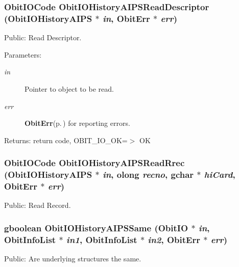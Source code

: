 \subsubsection{\setlength{\rightskip}{0pt plus 5cm}Obit\-IOCode Obit\-IOHistory\-AIPSRead\-Descriptor ({\bf Obit\-IOHistory\-AIPS} $\ast$ {\em in}, {\bf Obit\-Err} $\ast$ {\em err})}\label{ObitIOHistoryAIPS_8h_a17}


Public: Read Descriptor. 

\begin{Desc}
\item[Parameters:]
\begin{description}
\item[{\em in}]Pointer to object to be read. \item[{\em err}]{\bf Obit\-Err}{\rm (p.\,\pageref{structObitErr})} for reporting errors. \end{description}
\end{Desc}
\begin{Desc}
\item[Returns:]return code, OBIT\_\-IO\_\-OK=$>$ OK \end{Desc}
\subsubsection{\setlength{\rightskip}{0pt plus 5cm}Obit\-IOCode Obit\-IOHistory\-AIPSRead\-Rrec ({\bf Obit\-IOHistory\-AIPS} $\ast$ {\em in}, {\bf olong} {\em recno}, gchar $\ast$ {\em hi\-Card}, {\bf Obit\-Err} $\ast$ {\em err})}\label{ObitIOHistoryAIPS_8h_a14}


Public: Read Record. 

\subsubsection{\setlength{\rightskip}{0pt plus 5cm}gboolean Obit\-IOHistory\-AIPSSame ({\bf Obit\-IO} $\ast$ {\em in}, {\bf Obit\-Info\-List} $\ast$ {\em in1}, {\bf Obit\-Info\-List} $\ast$ {\em in2}, {\bf Obit\-Err} $\ast$ {\em err})}\label{ObitIOHistoryAIPS_8h_a8}


Public: Are underlying structures the same. 

